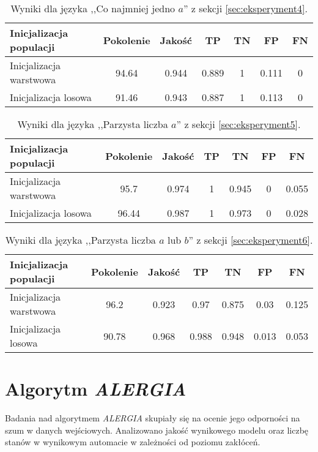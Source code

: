 \begin{table}[ht]
\centering
\caption{Wyniki dla języka ,,Co najmniej jedno \( a \)'' z sekcji \ref{sec:eksperyment4}.}
\label{tab:gig_one_a}
\begin{tabular}{|l|c|c|c|c|c|c|}
\hline
Inicjalizacja populacji & Pokolenie & Jakość & TP & TN & FP & FN \\ \hline
Inicjalizacja warstwowa & \num{94.64} & \num{0.944} & \num{0.889} & \num{1} & \num{0.111} & \num{0} \\ \hline
Inicjalizacja losowa    & \num{91.46} & \num{0.943} & \num{0.887} & \num{1} & \num{0.113} & \num{0} \\ \hline
\end{tabular}
\end{table}

\begin{table}[ht]
\centering
\caption{Wyniki dla języka ,,Parzysta liczba \( a \)'' z sekcji \ref{sec:eksperyment5}.}
\label{tab:gig_even_a}
\begin{tabular}{|l|c|c|c|c|c|c|}
\hline
Inicjalizacja populacji & Pokolenie & Jakość & TP & TN & FP & FN \\ \hline
Inicjalizacja warstwowa & \num{95.7}  & \num{0.974} & \num{1} & \num{0.945} & \num{0} & \num{0.055} \\ \hline
Inicjalizacja losowa    & \num{96.44} & \num{0.987} & \num{1} & \num{0.973} & \num{0} & \num{0.028} \\ \hline
\end{tabular}
\end{table}

\begin{table}[ht]
\centering
\caption{Wyniki dla języka ,,Parzysta liczba \( a \) lub \( b \)'' z sekcji \ref{sec:eksperyment6}.}
\label{tab:gig_even_a_or_b}
\begin{tabular}{|l|c|c|c|c|c|c|}
\hline
Inicjalizacja populacji & Pokolenie & Jakość & TP & TN & FP & FN \\ \hline
Inicjalizacja warstwowa & \num{96.2}  & \num{0.923} & \num{0.97}  & \num{0.875} & \num{0.03}  & \num{0.125} \\ \hline
Inicjalizacja losowa    & \num{90.78} & \num{0.968} & \num{0.988} & \num{0.948} & \num{0.013} & \num{0.053} \\ \hline
\end{tabular}
\end{table}


\section{Algorytm \textit{ALERGIA}}  
Badania nad algorytmem \textit{ALERGIA} skupiały się na ocenie jego odporności na szum w danych wejściowych. Analizowano jakość wynikowego modelu oraz liczbę stanów w wynikowym automacie w zależności od poziomu zakłóceń.

